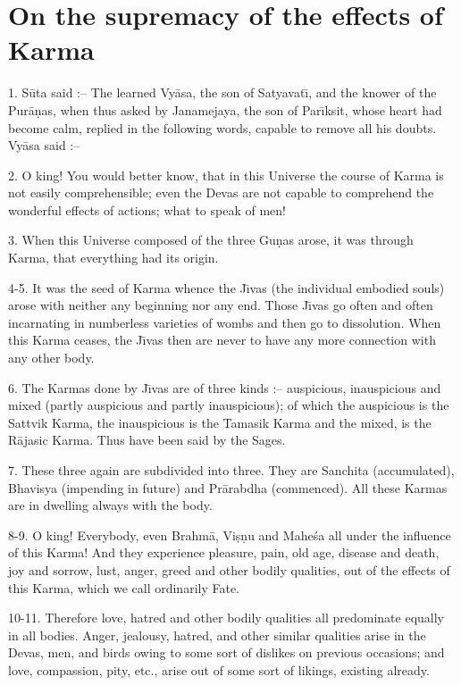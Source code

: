 \chapter{On the supremacy of the effects of Karma}

1. S\=uta said :-- The learned Vy\=asa, the son of Satyavat\={\i}, and the knower of the Pur\=a\d{n}as, when thus asked by Janamejaya, the son of Par\={\i}ksit, whose heart had become calm, replied in the following words, capable to remove all his doubts. Vy\=asa said :--

2. O king! You would better know, that in this Universe the course of Karma is not easily comprehensible; even the Devas are not capable to comprehend the wonderful effects of actions; what to speak of men!

3. When this Universe composed of the three Gu\d{n}as arose, it was through Karma, that everything had its origin.

4-5. It was the seed of Karma whence the J\={\i}vas (the individual embodied souls) arose with neither any beginning nor any end. Those J\={\i}vas go often and often incarnating in numberless varieties of wombs and then go to dissolution. When this Karma ceases, the J\={\i}vas then are never to have any more connection with any other body.

6. The Karmas done by J\={\i}vas are of three kinds :-- auspicious, inauspicious and mixed (partly auspicious and partly inauspicious); of which the auspicious is the Sattvik Karma, the inauspicious is the Tamasik Karma and the mixed, is the R\=ajasic Karma. Thus have been said by the Sages.

7. These three again are subdivided into three. They are Sanchita (accumulated), Bhavisya (impending in future) and Pr\=arabdha (commenced). All these Karmas are in dwelling always with the body.

8-9. O king! Everybody, even Brahm\=a, Vi\d{s}\d{n}u and Mahe\'sa all under the influence of this Karma! And they experience pleasure, pain, old age, disease and death, joy and sorrow, lust, anger, greed and other bodily qualities, out of the effects of this Karma, which we call ordinarily Fate.

10-11. Therefore love, hatred and other bodily qualities all predominate equally in all bodies. Anger, jealousy, hatred, and other similar qualities arise in the Devas, men, and birds owing to some sort of dislikes on previous occasions; and love, compassion, pity, etc., arise out of some sort of likings, existing already.

